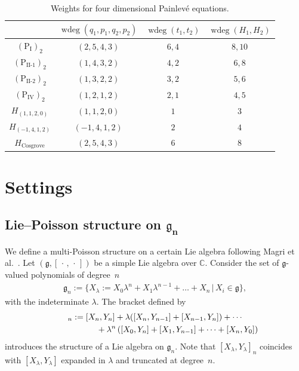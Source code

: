 \documentclass[10pt,a4paper]{amsart}
\numberwithin{equation}{section}
\begin{document}
\begin{table}[h]\centering\caption{Weights for four dimensional Painlev\'{e} equations.}\label{table2}\vspace{1mm}
\begin{tabular}{|c||c|c|c|}
\hline
 & $\operatorname{wdeg}(q_1,p_1,q_2,p_2)$ & $\operatorname{wdeg} (t_1, t_2)$ & $\operatorname{wdeg} (H_1, H_2)$ \\ \hline \hline
$(\text{P}_\text{I})_2$ & $(2,5,4,3)$ & $6,4$ & $8,10$ \\ \hline
$(\text{P}_\text{II-1})_2$ & $(1,4,3,2)$ & $4,2$ & $6,8$ \\ \hline
$(\text{P}_\text{II-2})_2$ & $(1,3,2,2)$ & $3,2$ & $5,6$ \\ \hline
$(\text{P}_\text{IV})_2$ & $(1,2,1,2)$ & $2,1$ & $4,5$ \\ \hline
$H_{(1,1,2,0)}$ & $(1,1,2,0)$ & $1$ & $3$ \\ \hline
$H_{(-1,4,1,2)}$ & $(-1,4,1,2)$ & $2$ & $4$ \\ \hline
$H_{\text{Cosgrove}}$ & $(2,5,4,3)$ & $6$ & $8$ \\ \hline
\end{tabular}
\end{table}

\section{Settings}\label{section2}

\subsection[Lie--Poisson structure on $\mathfrak{g}_n$]{Lie--Poisson structure on $\boldsymbol{\mathfrak{g}_n}$}\label{section2.1}

We def\/ine a multi-Poisson structure on a certain Lie algebra following Magri et al.~\cite{Mag1,Mag2,Mag3,Mag4}. Let $(\mathfrak{g}, [\, \cdot \,, \,\cdot \,])$ be a simple Lie algebra over $\mathbb{C}$. Consider the set of $\mathfrak{g}$-valued polynomials of degree~$n$
\begin{gather*}
\mathfrak{g}_n:= \big\{ X_\lambda := X_0 \lambda ^n + X_1\lambda ^{n-1} + \dots + X_n \, | \, X_i\in \mathfrak{g}\big\},
\end{gather*}
with the indeterminate $\lambda $. The bracket def\/ined by
\begin{gather*}
[X_\lambda ,Y_\lambda ]_n := [X_n, Y_n] + \lambda ([X_n, Y_{n-1}] + [X_{n-1}, Y_n]) + \cdots \\
\hphantom{[X_\lambda ,Y_\lambda ]_n :=}{} + \lambda ^n \left( [X_0, Y_n] + [X_1, Y_{n-1}] + \dots + [X_n, Y_0] \right)
\end{gather*}
introduces the structure of a Lie algebra on $\mathfrak{g}_n$. Note that $[X_\lambda , Y_\lambda ]_n$ coincides with $[X_\lambda , Y_\lambda ]$ expanded in $\lambda $ and truncated at degree~$n$.
\end{document}
